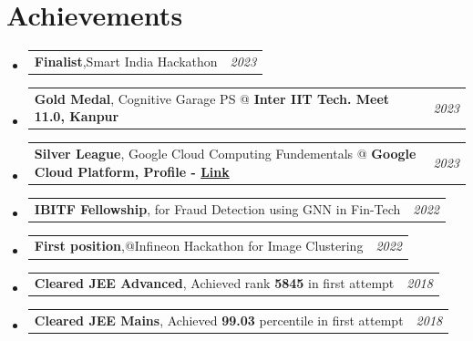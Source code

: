 \documentclass[a4paper,11pt]{article}
\makeatletter
\newcommand{\resumePOR}[3]{
\vspace{0.5mm}\item
    \begin{tabular*}{0.97\textwidth}[t]{l@{\extracolsep{\fill}}r}
        \textbf{#1},\hspace{0.3mm}#2 & \textit{\small{#3}} 
    \end{tabular*}
    \vspace{-2mm}
}
\newcommand{\resumeSubHeadingListStart}{\begin{itemize}[leftmargin=*,labelsep=0mm]}
\newcommand{\resumeSubHeadingListEnd}{\end{itemize}\vspace{2mm}}
\makeatother
\begin{document}
\section{Achievements}
\vspace{-0.2mm}
\resumeSubHeadingListStart
\resumePOR{Finalist}{Smart India Hackathon}{2023}
\resumePOR{Gold Medal}{ Cognitive Garage PS @ \textbf{Inter IIT Tech. Meet 11.0, Kanpur}}{2023}
\resumePOR{Silver League}{ Google Cloud Computing Fundementals @ \textbf{Google Cloud Platform, Profile - \href{https://www.cloudskillsboost.google/public_profiles/8d19cb80-1531-4716-b27c-443dbb8a2a8f}{Link}}}{2023}
\resumePOR{IBITF Fellowship} %
{ for Fraud Detection using GNN in Fin-Tech} %
{2022} %
\resumePOR{First position} %
{@Infineon Hackathon for Image Clustering} %
{2022} %
\resumePOR{Cleared JEE Advanced} %
{ Achieved rank \textbf{5845} in first attempt} %
{2018} %
\resumePOR{Cleared JEE Mains} %
{ Achieved \textbf{99.03} percentile in first attempt} %
{2018} %
\resumeSubHeadingListEnd






\end{document}
